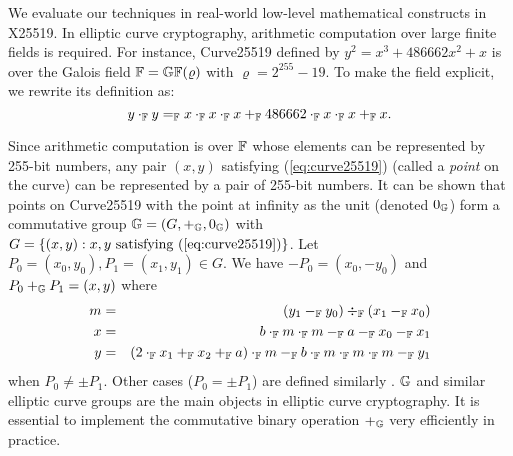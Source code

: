 
We evaluate our techniques in real-world low-level mathematical
constructs in X25519. 
In elliptic curve cryptography, arithmetic computation over
large finite fields is required. For
instance, Curve25519 defined by $y^2 = x^3 + 486662 x^2 + x$ 
is over the Galois field $\mathbb{F} = \mathbb{GF}(\varrho)$ with
$\varrho = 2^{255} - 19$. To
make the field explicit, we rewrite its definition as:
\begin{equation}
  \label{eq:curve25519}
  y \cdot_{\mathbb{F}} y =_{\mathbb{F}} x \cdot_{\mathbb{F}} x \cdot_{\mathbb{F}} x +_{\mathbb{F}}
  486662 \cdot_{\mathbb{F}} x \cdot_{\mathbb{F}} x +_{\mathbb{F}} x.
\end{equation}

Since arithmetic computation is over $\mathbb{F}$ whose
elements can be represented by 255-bit numbers,
any pair $(x, y)$ satisfying (\ref{eq:curve25519}) (called a
\emph{point} on the curve) can be represented by a pair of 255-bit
numbers. It can be shown that points on Curve25519 with the point at
infinity as the unit (denoted $0_{\mathbb{G}}$) form a commutative group $\mathbb{G} = (G, +_{\mathbb{G}}, 0_{\mathbb{G}})$
with $G = \{ (x, y) : x, y \textmd{ satisfying } (\ref{eq:curve25519})
\}$. Let $P_0 = (x_0, y_0), P_1 = (x_1, y_1) \in G$. We have $-P_0 =
(x_0, -y_0)$ and $P_0 +_{\mathbb{G}} P_1 = (x, y)$  where
\begin{eqnarray}
  m & = & (y_1 \Fminus y_0) \Fdiv (x_1 \Fminus x_0)\\\nonumber
  x & = & b \Ftimes m \Ftimes m \Fminus a \Fminus x_0 \Fminus x_1\\ \nonumber
  y & = & %
          (2 \Ftimes x_1 \Fplus x_2 \Fplus a )\Ftimes m
          \Fminus b \Ftimes m \Ftimes m \Ftimes m\Fminus y_1
  \label{eq:curve25519-group}
\end{eqnarray}
when $P_0 \neq \pm P_1$. Other cases ($P_0 = \pm P_1$) are defined
similarly . 
$\mathbb{G}$ and similar elliptic curve groups
are the main objects in elliptic curve cryptography. It is
essential to implement the commutative binary operation $+_{\mathbb{G}}$ very
efficiently in practice.

